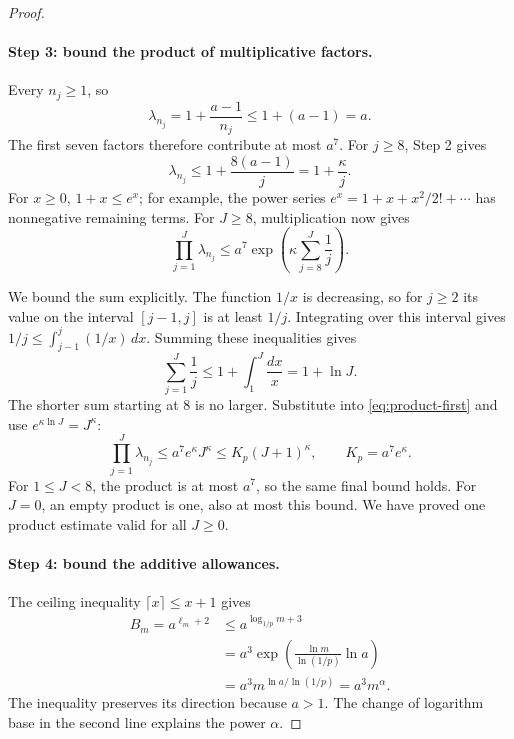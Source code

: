 \documentclass[11pt,a4paper]{article}
\theoremstyle{readable}
\begin{document}
\begin{proof}
\paragraph{Step 3: bound the product of multiplicative factors.}
Every $n_j\ge1$, so
\[
  \lambda_{n_j}=1+\frac{a-1}{n_j}\le1+(a-1)=a.
\]
The first seven factors therefore contribute at most $a^7$.
For $j\ge8$, Step 2 gives
\[
  \lambda_{n_j}\le1+\frac{8(a-1)}j=1+\frac\kappa j.
\]
For $x\ge0$, $1+x\le e^x$; for example, the power series
$e^x=1+x+x^2/2!+\cdots$ has nonnegative remaining terms. For
$J\ge8$, multiplication now gives
\begin{equation}
  \prod_{j=1}^J\lambda_{n_j}
    \le a^7\exp\!\left(\kappa\sum_{j=8}^J\frac1j\right).
  \label{eq:product-first}
\end{equation}

We bound the sum explicitly. The function $1/x$ is decreasing, so
for $j\ge2$ its value on the interval $[j-1,j]$ is at least $1/j$.
Integrating over this interval gives
$1/j\le\int_{j-1}^{j}(1/x)\,dx$. Summing these inequalities gives
\[
  \sum_{j=1}^J\frac1j
    \le1+\int_1^J\frac{dx}{x}=1+\ln J.
\]
The shorter sum starting at 8 is no larger. Substitute into
\eqref{eq:product-first} and use $e^{\kappa\ln J}=J^\kappa$:
\[
  \prod_{j=1}^J\lambda_{n_j}
     \le a^7e^\kappa J^\kappa
     \le K_p(J+1)^\kappa,
  \qquad K_p=a^7e^\kappa.
\]
For $1\le J<8$, the product is at most $a^7$, so the same final
bound holds. For $J=0$, an empty product is one, also at most this
bound. We have proved one product estimate valid for all $J\ge0$.

\paragraph{Step 4: bound the additive allowances.}
The ceiling inequality $\lceil x\rceil\le x+1$ gives
\begin{align*}
  B_m=a^{\ell_m+2}
   &\le a^{\log_{1/p}m+3}\\
   &=a^3\exp\!\left(\frac{\ln m}{\ln(1/p)}\ln a\right)\\
   &=a^3m^{\ln a/\ln(1/p)}=a^3m^\alpha.
\end{align*}
The inequality preserves its direction because $a>1$. The change
of logarithm base in the second line explains the power $\alpha$.


\end{proof}
\end{document}
